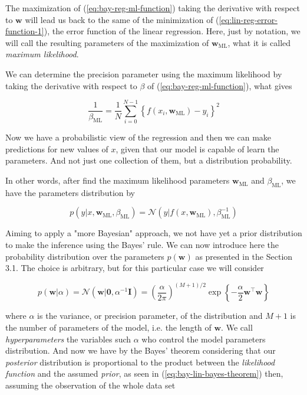 \documentclass[11pt]{article} %
\begin{document}
The maximization of (\ref{eq:bay-reg-ml-function}) taking the derivative with respect to $\mathbf{w}$ will lead us back to 
the same of the minimization of (\ref{eq:lin-reg-error-function-1}), the error function of the linear regression. Here, just by notation, we will call the resulting parameters of the maximization of $\mathbf{w}_{\text{ML}}$, what it is called \textit{maximum likelihood}.

We can determine the precision parameter using the maximum likelihood by taking the derivative with respect to $\beta$ of (\ref{eq:bay-reg-ml-function}), what gives

\begin{equation}
   \frac{1}{\beta_{\mathrm{ML}}}=\frac{1}{N} \sum_{i=0}^{N-1}\left\{f\left(x_{i}, \mathbf{w}_{\mathrm{ML}}\right)-y_{i}\right\}^{2}
\end{equation}

Now we have a probabilistic view of the regression and then we can make predictions for new values of $x$, given that our model is capable of learn the parameters. And not just one collection of them, but a distribution probability.

In other words, after find the maximum likelihood parameters $\mathbf{w}_\text{ML}$ and $\beta_\text{ML}$, we have the parameters distribution by

\begin{equation}
   p\left(y | x, \mathbf{w}_{\mathrm{ML}}, \beta_{\mathrm{ML}}\right)=\mathcal{N}\left(y | f\left(x, \mathbf{w}_{\mathrm{ML}}\right), \beta_{\mathrm{ML}}^{-1}\right)
\end{equation}

Aiming to apply a "more Bayesian" approach, we not have yet a prior distribution to make the inference using the Bayes' rule. We can now introduce here the probability distribution over the parameters $p(\mathbf{w})$ as presented in the Section 3.1. The choice is arbitrary, but for this particular case we will consider

\begin{equation}
   \label{eq:bay-lin-reg-prior-dist}
   p(\mathbf{w} | \alpha)=\mathcal{N}\left(\mathbf{w} | \mathbf{0}, \alpha^{-1} \mathbf{I}\right)=\left(\frac{\alpha}{2 \pi}\right)^{(M+1) / 2} \exp \left\{-\frac{\alpha}{2} \mathbf{w}^\top \mathbf{w}\right\}
\end{equation}

where $\alpha$ is the variance, or precision parameter, of the distribution and $M+1$ is the number of parameters of the model, i.e. the length of $\mathbf{w}$. We call \textit{hyperparameters} the variables such $\alpha$ who control the model parameters distribution. And now we have by the Bayes' theorem considering that our \textit{posterior} distribution is proportional to the product between the \textit{likelihood function} and the assumed \textit{prior}, as seen in (\ref{eq:bay-lin-bayes-theorem}) then, assuming the observation of the whole data set
\end{document}
